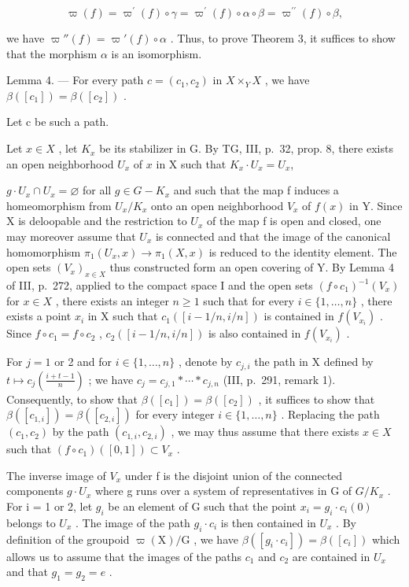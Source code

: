 \[
\varpi (f) = \varpi^ {\prime} (f) \circ \gamma = \varpi^ {\prime} (f) \circ \alpha \circ \beta = \varpi^ {\prime \prime} (f) \circ \beta ,
\]

we have \(\varpi''(f) = \varpi'(f) \circ \alpha\) . Thus, to prove Theorem 3, it suffices to show that the morphism \(\alpha\) is an isomorphism.

Lemma 4. --- For every path \(c = (c_1, c_2)\) in \(X \times_Y X\) , we have \(\beta([c_1]) = \beta([c_2])\) .

Let c be such a path.

Let \(x \in X\) , let \(K_x\) be its stabilizer in G. By TG, III, p.~32, prop. 8, there exists an open neighborhood \(U_x\) of \(x\) in X such that \(K_x \cdot U_x = U_x\),

\(g \cdot U_x \cap U_x = \varnothing\) for all \(g \in G - K_x\) and such that the map f induces a homeomorphism from \(U_x/K_x\) onto an open neighborhood \(V_x\) of \(f(x)\) in Y. Since X is deloopable and the restriction to \(U_x\) of the map f is open and closed, one may moreover assume that \(U_x\) is connected and that the image of the canonical homomorphism \(\pi_1(U_x, x) \to \pi_1(X, x)\) is reduced to the identity element. The open sets \((V_x)_{x \in X}\) thus constructed form an open covering of Y. By Lemma 4 of III, p.~272, applied to the compact space I and the open sets \((f \circ c_1)^{-1}(V_x)\) for \(x \in X\) , there exists an integer \(n \geqslant 1\) such that for every \(i \in \{1, \ldots, n\}\) , there exists a point \(x_i\) in X such that \(c_1([i-1/n, i/n])\) is contained in \(f(V_{x_i})\) . Since \(f \circ c_1 = f \circ c_2\) , \(c_2([i-1/n, i/n])\) is also contained in \(f(V_{x_i})\) .

For \(j = 1\) or 2 and for \(i \in \{1, \ldots, n\}\) , denote by \(c_{j,i}\) the path in X defined by \(t \mapsto c_j(\frac{i+t-1}{n})\) ; we have \(c_j = c_{j,1} * \cdots * c_{j,n}\) (III, p.~291, remark 1). Consequently, to show that \(\beta([c_1]) = \beta([c_2])\) , it suffices to show that \(\beta([c_{1,i}]) = \beta([c_{2,i}])\) for every integer \(i \in \{1, \ldots, n\}\) . Replacing the path \((c_1, c_2)\) by the path \((c_{1,i}, c_{2,i})\) , we may thus assume that there exists \(x \in X\) such that \((f \circ c_1)([0,1]) \subset V_x\) .

The inverse image of \(V_{x}\) under f is the disjoint union of the connected components \(g \cdot U_{x}\) where g runs over a system of representatives in G of \(G/K_{x}\) . For i = 1 or 2, let \(g_{i}\) be an element of G such that the point \(x_{i} = g_{i} \cdot c_{i}(0)\) belongs to \(U_{x}\) . The image of the path \(g_{i} \cdot c_{i}\) is then contained in \(U_{x}\) . By definition of the groupoid \(\varpi(\mathrm{X})/\mathrm{G}\) , we have \(\beta([g_{i} \cdot c_{i}]) = \beta([c_{i}])\) which allows us to assume that the images of the paths \(c_{1}\) and \(c_{2}\) are contained in \(U_{x}\) and that \(g_{1} = g_{2} = e\) .

